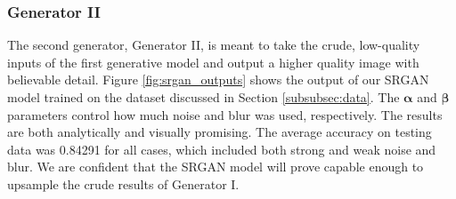 \documentclass{article}
\begin{document}
\subsubsection{Generator II}
The second generator, Generator II,
is meant to take the crude, low-quality inputs of the first generative model
and output a higher quality image with believable detail.
Figure \ref{fig:srgan_outputs} shows the output of our SRGAN model trained
on the dataset discussed in Section \ref{subsubsec:data}.
The $\mathbf{\alpha}$ and $\mathbf{\beta}$ parameters control
how much noise and blur was used, respectively.
The results are both analytically and visually promising.
The average accuracy on testing data was 0.84291 for all cases,
which included both strong and weak noise and blur. We are confident that
the SRGAN model will prove capable enough to upsample the crude results of
Generator I.
\end{document}
